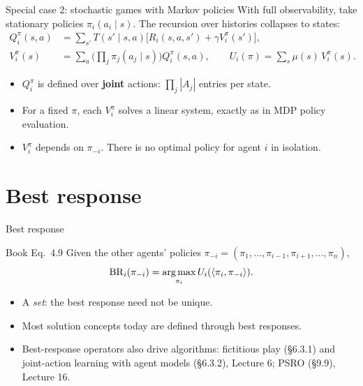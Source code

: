 \documentclass[aspectratio=169,11pt]{beamer}
\begin{document}
\begin{frame}{Special case 2: stochastic games with Markov policies}
  With full observability, take stationary policies $\pi_i(a_i \mid s)$. The recursion over histories collapses to states:
  \begin{align*}
    Q_i^\pi(s, a) &= \sum_{s'} T(s' \mid s, a) \big[ R_i(s, a, s') + \gamma V_i^\pi(s') \big], \\
    V_i^\pi(s) &= \sum_{a} \Big( \prod_{j} \pi_j(a_j \mid s) \Big) Q_i^\pi(s, a),
    \qquad U_i(\pi) = \sum_s \mu(s)\, V_i^\pi(s).
  \end{align*}
  \begin{itemize}
    \item $Q_i^\pi$ is defined over \textbf{joint} actions: $\prod_j |A_j|$ entries per state.
    \item For a fixed $\pi$, each $V_i^\pi$ solves a linear system, exactly as in MDP policy evaluation.
    \item $V_i^\pi$ depends on $\pi_{-i}$. There is no optimal policy for agent $i$ in isolation.
  \end{itemize}
\end{frame}

\section{Best response}

\begin{frame}{Best response}
  \begin{block}{Book Eq.\ 4.9}
    Given the other agents' policies $\pi_{-i} = (\pi_1, \dots, \pi_{i-1}, \pi_{i+1}, \dots, \pi_n)$,
    \[
      \operatorname{BR}_i(\pi_{-i}) = \operatorname*{arg\,max}_{\pi_i} U_i(\langle \pi_i, \pi_{-i} \rangle).
    \]
  \end{block}
  \begin{itemize}
    \item A \emph{set}: the best response need not be unique.
    \item Most solution concepts today are defined through best responses.
    \item Best-response operators also drive algorithms: fictitious play (\S6.3.1) and joint-action learning with agent models (\S6.3.2), Lecture 6; PSRO (\S9.9), Lecture 16.
  \end{itemize}
\end{frame}
\end{document}
